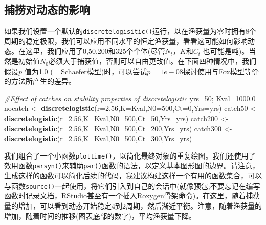 \documentclass[
  lang=cn,
  11pt,
  scheme=chinese,
  chinesefont=nofont,
  citestyle=gb7714-2015,
  bibstyle=gb7714-2015]{elegantbook}
\newenvironment{Shaded}{\begin{snugshade}}{\end{snugshade}}
\newcommand{\AttributeTok}[1]{\textcolor[rgb]{0.13,0.29,0.53}{#1}}
\newcommand{\CommentTok}[1]{\textcolor[rgb]{0.56,0.35,0.01}{\textit{#1}}}
\newcommand{\DecValTok}[1]{\textcolor[rgb]{0.00,0.00,0.81}{#1}}
\newcommand{\FloatTok}[1]{\textcolor[rgb]{0.00,0.00,0.81}{#1}}
\newcommand{\FunctionTok}[1]{\textcolor[rgb]{0.13,0.29,0.53}{\textbf{#1}}}
\newcommand{\NormalTok}[1]{#1}
\newcommand{\OtherTok}[1]{\textcolor[rgb]{0.56,0.35,0.01}{#1}}
\begin{document}
\subsection{捕捞对动态的影响}\label{ux6355ux635eux5bf9ux52a8ux6001ux7684ux5f71ux54cd}

如果我们设置一个默认的\texttt{discretelogisitic()}运行，以在渔获量为零时拥有8个周期的稳定极限，我们可以应用不同水平的恒定渔获量，看看这可能如何影响动态。在这里，我们应用了0,50,200和325个个体(尽管\(N_t\)，\(K\)和\(C_t\) 也可能是吨)。当然是初始值\(N_0\)必须大于捕获值，否则可以自由更改值。在下面四种情况中，我们假设\(p\) 值为1.0 (= Schaefer模型)时，可以尝试\(p=1e−08\)探讨使用与Fox模型等价的方法所产生的差异。

\begin{Shaded}
\begin{Highlighting}[]
 \CommentTok{\#Effect of catches on stability properties of discretelogistic  }
\NormalTok{yrs}\OtherTok{=}\DecValTok{50}\NormalTok{; Kval}\OtherTok{=}\FloatTok{1000.0}  
\NormalTok{nocatch }\OtherTok{\textless{}{-}} \FunctionTok{discretelogistic}\NormalTok{(}\AttributeTok{r=}\FloatTok{2.56}\NormalTok{,}\AttributeTok{K=}\NormalTok{Kval,}\AttributeTok{N0=}\DecValTok{500}\NormalTok{,}\AttributeTok{Ct=}\DecValTok{0}\NormalTok{,}\AttributeTok{Yrs=}\NormalTok{yrs)  }
\NormalTok{catch50 }\OtherTok{\textless{}{-}} \FunctionTok{discretelogistic}\NormalTok{(}\AttributeTok{r=}\FloatTok{2.56}\NormalTok{,}\AttributeTok{K=}\NormalTok{Kval,}\AttributeTok{N0=}\DecValTok{500}\NormalTok{,}\AttributeTok{Ct=}\DecValTok{50}\NormalTok{,}\AttributeTok{Yrs=}\NormalTok{yrs)  }
\NormalTok{catch200 }\OtherTok{\textless{}{-}} \FunctionTok{discretelogistic}\NormalTok{(}\AttributeTok{r=}\FloatTok{2.56}\NormalTok{,}\AttributeTok{K=}\NormalTok{Kval,}\AttributeTok{N0=}\DecValTok{500}\NormalTok{,}\AttributeTok{Ct=}\DecValTok{200}\NormalTok{,}\AttributeTok{Yrs=}\NormalTok{yrs)  }
\NormalTok{catch300 }\OtherTok{\textless{}{-}} \FunctionTok{discretelogistic}\NormalTok{(}\AttributeTok{r=}\FloatTok{2.56}\NormalTok{,}\AttributeTok{K=}\NormalTok{Kval,}\AttributeTok{N0=}\DecValTok{500}\NormalTok{,}\AttributeTok{Ct=}\DecValTok{300}\NormalTok{,}\AttributeTok{Yrs=}\NormalTok{yrs)  }
\end{Highlighting}
\end{Shaded}

我们组合了一个小函数\texttt{plottime()}，以简化最终对象的重复绘图。我们还使用了效用函数\texttt{parsyn()}来辅助\texttt{par()}函数的语法，以定义基本图形图的边界。请注意，生成这样的函数可以简化后续的代码，我建议构建这样一个有用的函数集合，可以与函数\texttt{source()}一起使用，将它们引入到自己的会话中(就像预包;不要忘记在编写函数时记录文档，RStudio甚至有一个插入Roxygen骨架命令)。在这里，随着捕获量的增加，可以看到动态开始稳定4到2周期，然后渐近平衡。注意，随着渔获量的增加，随着时间的推移(图表底部的数字)，平均渔获量下降。
\end{document}

